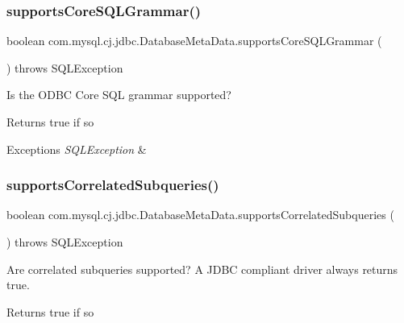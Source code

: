 \subsubsection{\texorpdfstring{supports\+Core\+S\+Q\+L\+Grammar()}{supportsCoreSQLGrammar()}}
{\footnotesize\ttfamily boolean com.\+mysql.\+cj.\+jdbc.\+Database\+Meta\+Data.\+supports\+Core\+S\+Q\+L\+Grammar (\begin{DoxyParamCaption}{ }\end{DoxyParamCaption}) throws S\+Q\+L\+Exception}

Is the O\+D\+BC Core S\+QL grammar supported?

\begin{DoxyReturn}{Returns}
true if so 
\end{DoxyReturn}

\begin{DoxyExceptions}{Exceptions}
{\em S\+Q\+L\+Exception} & \\
\hline
\end{DoxyExceptions}
\mbox{\label{classcom_1_1mysql_1_1cj_1_1jdbc_1_1_database_meta_data_aa8fae9e793548d9cac13ca227bd7e43c}} 
\subsubsection{\texorpdfstring{supports\+Correlated\+Subqueries()}{supportsCorrelatedSubqueries()}}
{\footnotesize\ttfamily boolean com.\+mysql.\+cj.\+jdbc.\+Database\+Meta\+Data.\+supports\+Correlated\+Subqueries (\begin{DoxyParamCaption}{ }\end{DoxyParamCaption}) throws S\+Q\+L\+Exception}

Are correlated subqueries supported? A J\+D\+BC compliant driver always returns true.

\begin{DoxyReturn}{Returns}
true if so 
\end{DoxyReturn}

